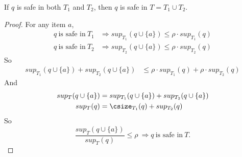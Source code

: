 %
%

\begin{lemma}%
\label{CorrectnessOfPartitioning}
  If $q$ is safe in both $T_1$ and $T_2$, then $q$ is safe in $T = T_1 \cup T_2$.
\end{lemma}
\begin{proof}
For any item $a$,
  \begin{align*}
   q~\text{is safe in}~T_1 &\Rightarrow sup_{T_1}(q\cup\{a\}) \le \rho\cdot sup_{T_1}(q) \\
   q~\text{is safe in}~T_2 &\Rightarrow sup_{T_2}(q\cup\{a\}) \le \rho\cdot sup_{T_2}(q)
  \end{align*}
  So \begin{align*}
   sup_{T_1}(q\cup\{a\}) + sup_{T_2}(q\cup\{a\}) &\le \rho\cdot sup_{T_1}(q) + \rho\cdot sup_{T_2}(q)
  \end{align*}
  And \begin{align*}
    sup_T(q\cup\{a\}) &= sup_{T_1}(q\cup\{a\}) + sup_{T_2}(q\cup\{a\}) \\
    sup_T(q) &= \csize_{T_1}(q) + sup_{T_2}(q)
  \end{align*}
  So $$ \frac{sup_T(q\cup\{a\})}{sup_T(q)} \le \rho~\Rightarrow q~\text{is safe in}~T .$$
\end{proof}


